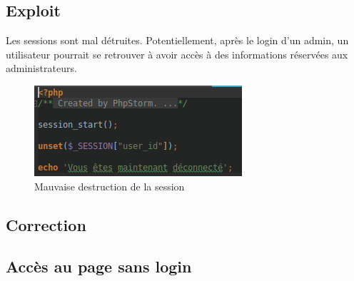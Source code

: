 \documentclass[12pt]{article}
\begin{document}
\subsection{Exploit}
Les sessions sont mal détruites. Potentiellement, après le login d'un admin, un utilisateur pourrait se retrouver à avoir accès à des informations réservées aux administrateurs.
\begin{figure}[H]
\centering
\includegraphics[width=\linewidth]{images/unset.png}
\caption{Mauvaise destruction de la session}
\end{figure}


\subsection{Correction}


\subsection{Accès au page sans login}
\end{document}
